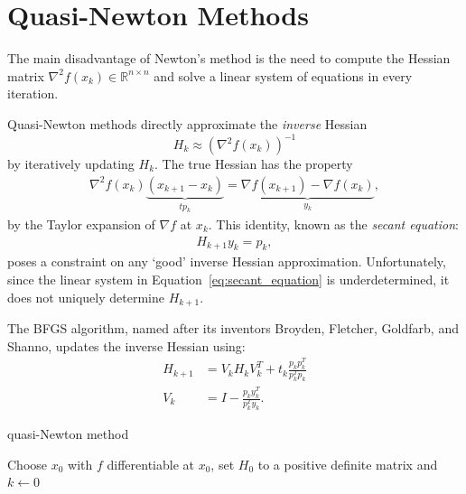 \documentclass{article}
\begin{document}
\section{Quasi-Newton Methods}

The main disadvantage of Newton's method
is the need to compute
the Hessian matrix $\nabla^2 f(x_k) \in \mathbb{R}^{n \times n}$
and solve a linear system of equations
in every iteration.

Quasi-Newton methods directly approximate the
\emph{inverse} Hessian
$$H_k \approx (\nabla^2 f(x_k))^{-1}$$
by iteratively updating $H_k$.
The true Hessian has the property
\begin{align*}
    \nabla^2 f(x_{k}) \underbrace{
        (x_{k + 1} - x_k)
    }_{t p_k} =
    \underbrace{
        \nabla f(x_{k + 1}) - \nabla f(x_k)
    }_{y_k},
\end{align*}
by the Taylor expansion of $\nabla f$ at $x_k$.
This identity, known as the \emph{secant equation}:
\begin{align}
    H_{k + 1} y_k = p_k,
    \label{eq:secant_equation}
\end{align}
poses a constraint on any `good' inverse Hessian approximation.
Unfortunately, since the linear system in Equation~\eqref{eq:secant_equation}
is underdetermined,
it does not uniquely determine $H_{k + 1}$.

The BFGS algorithm, named after its inventors
Broyden, Fletcher, Goldfarb, and Shanno,
updates the inverse Hessian using:
\begin{align*}
    H_{k + 1} & = V_k H_k V_k^T + t_k \frac{
        p_k p_k^T
    }{p_k^T p_k}                                   \\
    V_k       & = I - \frac{p_k y_k^T}{p_k^T y_k}.
\end{align*}

\begin{algorithm}[H]
    \caption{quasi-Newton method}
    \SetAlgoLined
    Choose $x_0$ with $f$ differentiable at $x_0$, set $H_0$ to a
    positive definite matrix and $k \gets 0$ \\
    \label{alg:quasi_newton}
\end{algorithm}
\end{document}
